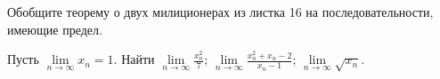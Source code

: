 \documentclass[a4paper, 12pt]{article}
\begin{document}
Обобщите теорему о двух милиционерах из листка 16
на последовательности, имеющие предел.




 Пусть $\lim\limits_{n \to \infty}\! x_n = 1$.
Найти
  $\displaystyle{\lim\limits_{n \to \infty}\!\frac{x_n^2}{7}}$;
  $\displaystyle{\lim\limits_{n \to \infty}\!\frac{x_n^2+x_n-2}{x_n-1}}$;
  $\lim\limits_{n \to \infty}\!\sqrt{x_n}$.




\end{document}
